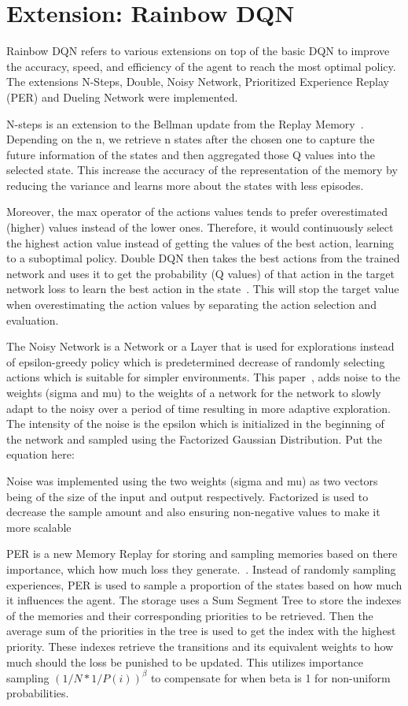 \documentclass{article}
\begin{document}
\section{Extension: Rainbow DQN}
Rainbow DQN refers to various extensions on top of the basic DQN to improve the accuracy, speed,  and efficiency of the agent to reach the most optimal policy.
The extensions N-Steps, Double, Noisy Network, Prioritized Experience Replay (PER) and Dueling Network were implemented.

N-steps is an extension to the Bellman update from the Replay Memory~\cite{garcia_understanding_2019}.
Depending on the n, we retrieve n states after the chosen one to capture the future information of the states and then aggregated those Q values into the selected state.
This increase the accuracy of the representation of the memory by reducing the variance and learns more about the states with less episodes.

Moreover, the max operator of the actions values tends to prefer overestimated (higher) values instead of the lower ones.
Therefore, it would continuously select the highest action value instead of getting the values of the best action, learning to a suboptimal policy.
Double DQN then takes the best actions from the trained network and uses it to get the probability (Q values) of that action in the target network loss to learn the best action in the state~\cite{hasselt_deep_2015}.
This will stop the target value when overestimating the action values by separating the action selection and evaluation.

The Noisy Network is a Network or a Layer that is used for explorations instead of epsilon-greedy policy which is predetermined decrease of randomly selecting actions which is suitable for simpler environments.
This paper~\cite{fortunato_noisy_2019}, adds noise to the weights (sigma and mu) to the weights of a network for the network to slowly adapt to the noisy over a period of time resulting in more adaptive exploration.
The intensity of the noise is the epsilon which is initialized in the beginning of the network and sampled using the Factorized Gaussian Distribution.
Put the equation here:

Noise was implemented using the two weights (sigma and mu) as two vectors being of the size of the input and output respectively.
Factorized is used to decrease the sample amount and also ensuring non-negative values to make it more scalable


PER is a new Memory Replay for storing and sampling memories based on there importance, which how much loss they generate.~\cite{schaul_prioritized_2016}.
Instead of randomly sampling experiences, PER is used to sample a proportion of the states based on how much it influences the agent.
The storage uses a Sum Segment Tree to store the indexes of the memories and their corresponding priorities to be retrieved.
Then the average sum of the priorities in the tree is used to get the index with the highest priority.
These indexes retrieve the transitions and its equivalent weights to how much should the loss be punished to be updated.
This utilizes importance sampling \((1/N * 1/P(i))^{\beta}\) to compensate for when beta is 1 for non-uniform probabilities.
\end{document}
